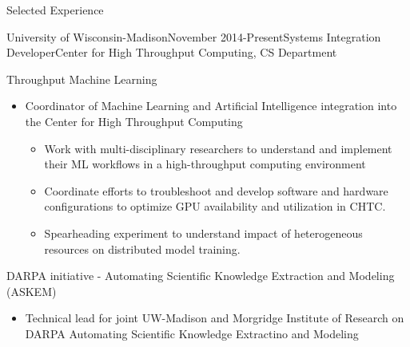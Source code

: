 \documentclass{resume} %
\begin{document}

\begin{rSection}{Selected Experience}




\begin{rSubsection}{University of Wisconsin-Madison}{November
    2014-Present}{Systems Integration Developer}{Center for High Throughput
    Computing, CS Department}
\item Throughput Machine Learning 
    \begin{itemize}{}{\leftmargin=1.5em} 
      \renewcommand\labelitemi{$\cdot$}
      \item Coordinator of Machine Learning and Artificial Intelligence
          integration into the Center for High Throughput Computing
        \begin{itemize}{}{\leftmargin=1.25em} 
          \itemsep -0.3em \vspace{-0.3em} %
          \item Work with multi-disciplinary researchers to understand and
          implement their ML workflows in a high-throughput computing
          environment
          \item Coordinate efforts to troubleshoot and develop software and
          hardware configurations to optimize GPU availability and utilization in CHTC.
          \item Spearheading experiment to understand impact of heterogeneous resources
          on distributed model training.
        \end{itemize}
    \end{itemize}
\item DARPA initiative - Automating Scientific Knowledge Extraction and Modeling (ASKEM)
    \begin{itemize}{}{\leftmargin=1.5em} 
      \renewcommand\labelitemi{$\cdot$}
      \item Technical lead for joint UW-Madison and Morgridge Institute of Research on DARPA Automating Scientific Knowledge Extractino and Modeling

\end{itemize}
\end{rSubsection}
\end{rSection}
\end{document}
